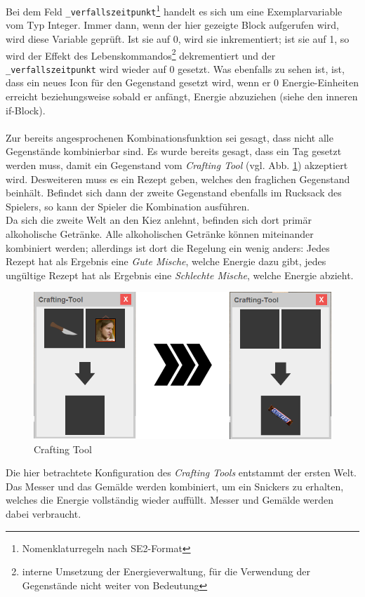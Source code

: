 \documentclass[12pt,twoside]{article}
\theoremstyle{plain}
\theoremstyle{definition}
\theoremstyle{remark}
\begin{document}
Bei dem Feld \texttt{\_verfallszeitpunkt}\footnote{Nomenklaturregeln nach SE2-Format} handelt es sich um eine Exemplarvariable vom Typ Integer.
Immer dann, wenn der hier gezeigte Block aufgerufen wird, wird diese Variable geprüft.
Ist sie auf 0, wird sie inkrementiert; ist sie auf 1, so wird der Effekt des Lebenskommandos\footnote{interne Umsetzung der Energieverwaltung, für die Verwendung der Gegenstände nicht weiter von Bedeutung} dekrementiert und der \texttt{\_verfallszeitpunkt} wird wieder auf 0 gesetzt.
Was ebenfalls zu sehen ist, ist, dass ein neues Icon für den Gegenstand gesetzt wird, wenn er 0 Energie-Einheiten erreicht beziehungsweise sobald er anfängt, Energie abzuziehen (siehe den inneren if-Block).\\
\\
Zur bereits angesprochenen Kombinationsfunktion sei gesagt, dass nicht alle Gegenstände kombinierbar sind.
Es wurde bereits gesagt, dass ein Tag gesetzt werden muss, damit ein Gegenstand vom \textit{Crafting Tool} (vgl. Abb. \ref{fig:main_craft}) akzeptiert wird.
Desweiteren muss es ein Rezept geben, welches den fraglichen Gegenstand beinhält.
Befindet sich dann der zweite Gegenstand ebenfalls im Rucksack des Spielers, so kann der Spieler die Kombination ausführen.\\
Da sich die zweite Welt an den Kiez anlehnt, befinden sich dort primär alkoholische Getränke.
Alle alkoholischen Getränke können miteinander kombiniert werden; allerdings ist dort die Regelung ein wenig anders: Jedes Rezept hat als Ergebnis eine \textit{Gute Mische}, welche Energie dazu gibt, jedes ungültige Rezept hat als Ergebnis eine \textit{Schlechte Mische}, welche Energie abzieht.
\begin{figure}[h!bt]
    \begin{center}
        \includegraphics[scale=0.5]{craftingUI.png}
    	\caption{Crafting Tool}
        \label{fig:main_craft}
    \end{center}
\end{figure}
Die hier betrachtete Konfiguration des \textit{Crafting Tools} entstammt der ersten Welt.
Das Messer und das Gemälde werden kombiniert, um ein Snickers zu erhalten, welches die Energie vollständig wieder auffüllt.
Messer und Gemälde werden dabei verbraucht.
\end{document}
